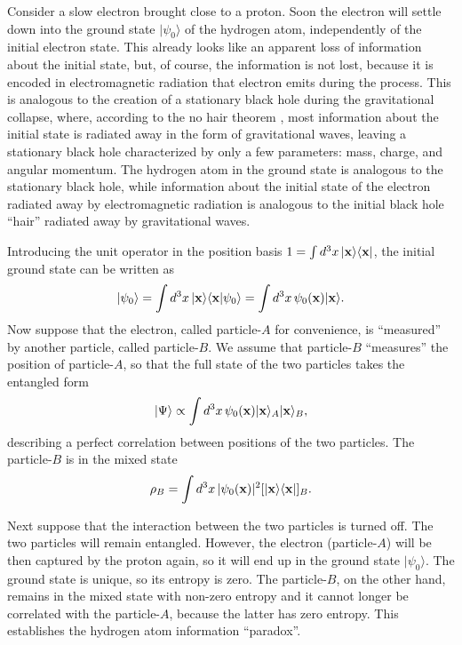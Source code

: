 \documentclass[12pt]{article}
\begin{document}
Consider a slow electron brought close to a proton. Soon the electron will
settle down into the ground state $|\psi_0\rangle$ of the hydrogen atom, independently of the initial electron state.
This already looks like an apparent loss of information about the initial state, but, of course, the information is not lost,
because it is encoded in electromagnetic radiation that electron emits during the process. This is analogous 
to the creation of a stationary black hole during the gravitational collapse, where, 
according to the no hair theorem \cite{hawking-ellis,frolov-novikov}, most information about the initial state is radiated away 
in the form of gravitational waves, leaving a stationary black hole characterized by only a few parameters:
mass, charge, and angular momentum. The hydrogen atom in the ground state is analogous to the stationary black hole, 
while information about the initial state of the electron radiated away by electromagnetic radiation
is analogous to the initial black hole ``hair'' radiated away by gravitational waves. 

Introducing the unit operator in the position basis $1=\int d^3x\,|{\bf x}\rangle\langle{\bf x}|$, 
the initial ground state can be written as 
\begin{equation}
 |\psi_0\rangle = \int d^3x\,|{\bf x}\rangle\langle{\bf x}|\psi_0\rangle 
 = \int d^3x\,\psi_0({\bf x}) |{\bf x}\rangle .
\end{equation}
Now suppose that the electron, called particle-$A$ for convenience,
is ``measured'' by another particle, called particle-$B$. We assume that particle-$B$ ``measures'' the position of particle-$A$,
so that the full state of the two particles takes the entangled form
\begin{equation}
 |\Psi\rangle \propto \int d^3x\,\psi_0({\bf x}) |{\bf x}\rangle_A |{\bf x}\rangle_B ,
\end{equation}
describing a perfect correlation between positions of the two particles.
The particle-$B$ is in the mixed state
\begin{equation}
 \rho_B=\int d^3x\,|\psi_0({\bf x})|^2 [|{\bf x}\rangle \langle{\bf x}|]_B .
\end{equation}

Next suppose that the interaction between the two particles is turned off. The two particles will remain entangled.
However, the electron (particle-$A$) will be then captured by the proton again, so it will end up in the ground state
$|\psi_0\rangle$. The ground state is unique, so its entropy is zero. The particle-$B$, on the other hand, remains in the 
mixed state with non-zero entropy and it cannot longer be correlated with the particle-$A$, because the latter has zero entropy. 
This establishes the hydrogen atom information ``paradox''. 
\end{document}
